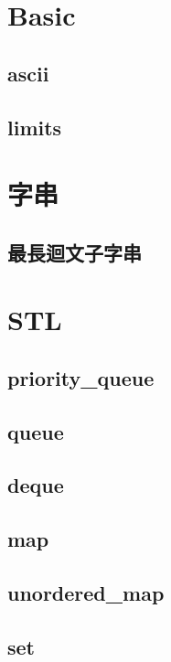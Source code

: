 \section{Basic}
    \subsection{ascii}
        
    \subsection{limits}
        

\section{字串}
    \subsection{最長迴文子字串}
        

\section{STL}
    \subsection{priority\_queue}
        
    \subsection{queue}
        
    \subsection{deque}
        
    \subsection{map}
        
    \subsection{unordered\_map}
        
    \subsection{set}
        
